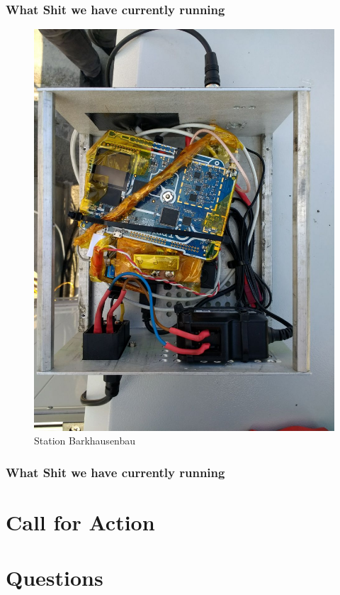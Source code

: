 \documentclass[aspectratio=169]{beamer}
\begin{document}

\begin{frame}
\frametitle{What Shit we have currently running}

\begin{figure}
\centering
\includegraphics[height=0.9\textheight, angle=90]{figs/station_barkhausen.jpg}
\caption{Station Barkhausenbau}
\end{figure}

\end{frame}


\begin{frame}
\frametitle{What Shit we have currently running}

\begin{tikzpicture}


\end{tikzpicture}

\end{frame}


\section{Call for Action}

\section{Questions}
\end{document}
